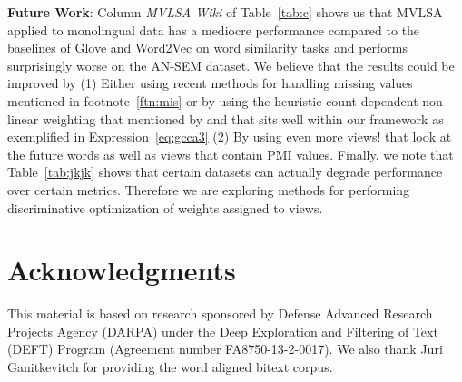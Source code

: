 \documentclass[11pt]{article}
\begin{document}
\noindent\textbf{Future Work}: Column \emph{MVLSA Wiki} of
Table~\ref{tab:c} shows us that MVLSA applied to monolingual data has
a mediocre performance  compared to the baselines of Glove and
Word2Vec on word similarity tasks and performs surprisingly worse on
the AN-SEM dataset. We believe that the results could be improved by (1)
Either using recent methods for handling missing values
mentioned in footnote~\ref{ftn:mis} or by using the heuristic count dependent
non-linear weighting that mentioned by 
and that sits well within our framework as exemplified in Expression~\ref{eq:gcca3}
 (2) By using even more views! that
look at the future words as well as views that contain PMI values. 
Finally, we note that Table~\ref{tab:jkjk} shows that certain datasets can
actually degrade performance over certain metrics. Therefore we are
exploring methods for performing discriminative optimization of weights
assigned to views.


\section*{Acknowledgments}
This material is based on research sponsored by Defense Advanced Research
Projects Agency (DARPA) under the Deep Exploration and
Filtering of Text (DEFT) Program (Agreement number
FA8750-13-2-0017). We also thank Juri Ganitkevitch for 
providing the word aligned bitext corpus.



\end{document}
